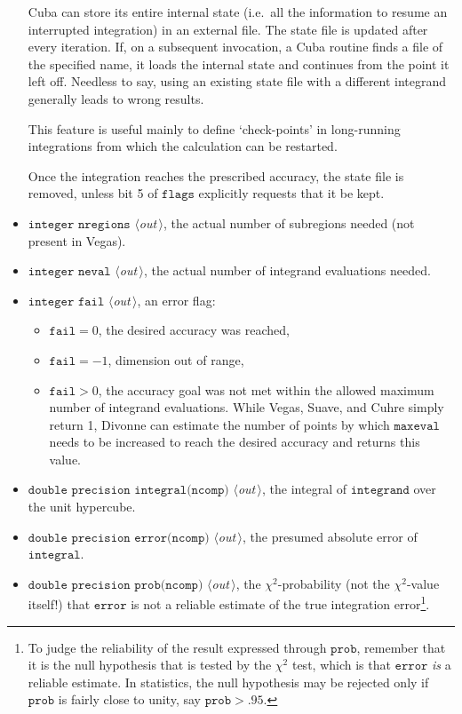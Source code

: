 \documentclass[12pt]{article}
\newcommand\ie{i.e.\ }
\newcommand\Code[1]{\ensuremath{\texttt{#1}}}
\newcommand\VarOut[1]{\item\Code{#1} \textit{$\langle$out\,$\rangle$},}
\begin{document}
\begin{itemize}
Cuba can store its entire internal state (\ie all the information to 
resume an interrupted integration) in an external file.  The state file 
is updated after every iteration.  If, on a subsequent invocation, a
Cuba routine finds a file of the specified name, it loads the internal
state and continues from the point it left off.  Needless to say, using
an existing state file with a different integrand generally leads to
wrong results.

This feature is useful mainly to define `check-points' in long-running 
integrations from which the calculation can be restarted.

Once the integration reaches the prescribed accuracy, the state file
is removed, unless bit 5 of \Code{flags} explicitly requests that it
be kept.

\VarOut{integer nregions}
the actual number of subregions needed (not present in Vegas).

\VarOut{integer neval}
the actual number of integrand evaluations needed.

\VarOut{integer fail}
an error flag:
\begin{itemize}
\item
$\Code{fail} = 0$, the desired accuracy was reached,
\item
$\Code{fail} = -1$, dimension out of range,
\item
$\Code{fail} > 0$, the accuracy goal was not met within the allowed
maximum number of integrand evaluations.  While Vegas, Suave, and Cuhre
simply return 1, Divonne can estimate the number of points by which
\Code{maxeval} needs to be increased to reach the desired accuracy and
returns this value.
\end{itemize}

\VarOut{double precision integral(ncomp)}
the integral of \Code{integrand} over the unit hypercube.

\VarOut{double precision error(ncomp)}
the presumed absolute error of \Code{integral}.

\VarOut{double precision prob(ncomp)}
the $\chi^2$-probability (not the $\chi^2$-value itself!) that
\Code{error} is not a reliable estimate of the true integration 
error\footnote{%
	To judge the reliability of the result expressed through
	\Code{prob}, remember that it is the null hypothesis that is 
	tested by the $\chi^2$ test, which is that \Code{error} 
	\emph{is} a reliable estimate.  In statistics, the null 
	hypothesis may be rejected only if \Code{prob} is fairly close 
	to unity, say $\Code{prob} > .95$.}.
\end{itemize}
\end{document}
